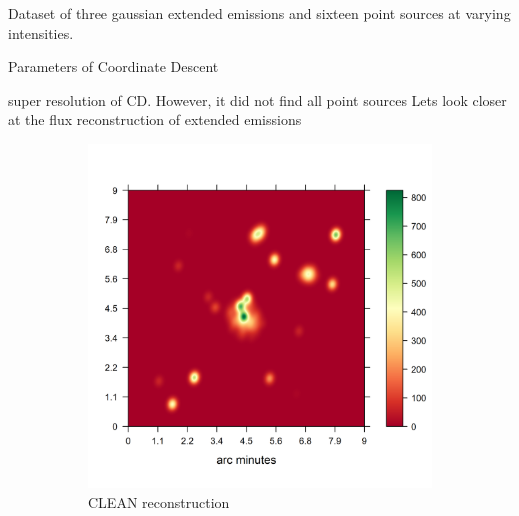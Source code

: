 Dataset of three gaussian extended emissions and sixteen point sources at varying intensities.

Parameters of Coordinate Descent

super resolution of CD. However, it did not find all point sources
Lets look closer at the flux reconstruction of extended emissions

\begin{figure}[h]
	\centering
	\begin{subfigure}[b]{0.4\linewidth}
		\includegraphics[width=\linewidth, trim={0.2in, 0.2in, 0, 0.2in}, clip]{./chapters/20.results/mixed/mixed_clean.png}
		\caption{CLEAN reconstruction}
		\label{results:mixed:tclean}
	\end{subfigure}
	\begin{subfigure}[b]{0.4\linewidth}

\end{subfigure}
\end{figure}
